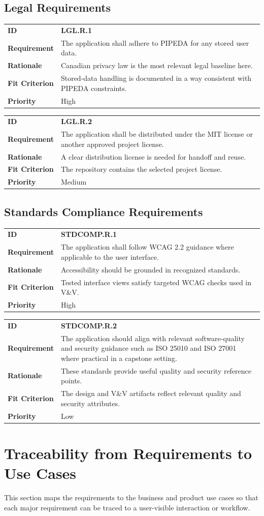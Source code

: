 \documentclass[12pt]{article}
\makeatletter
\newcommand{\reqcard}[5]{%
\noindent\begin{tabularx}{\textwidth}{@{}p{2.35cm}X@{}}
\textbf{ID} & \textbf{#1} \\
\textbf{Requirement} & #2 \\
\textbf{Rationale} & #3 \\
\textbf{Fit Criterion} & #4 \\
\textbf{Priority} & #5 \\
\end{tabularx}\par\medskip
}
\makeatother
\begin{document}
\subsection{Legal Requirements}
\reqcard{LGL.R.1}{The application shall adhere to PIPEDA for any
stored user data.}{Canadian privacy law is the most relevant legal
baseline here.}{Stored-data handling is documented in a way consistent
with PIPEDA constraints.}{High}

\reqcard{LGL.R.2}{The application shall be distributed under the MIT
license or another approved project license.}{A clear distribution
license is needed for handoff and reuse.}{The repository contains the
selected project license.}{Medium}

\subsection{Standards Compliance Requirements}
\reqcard{STDCOMP.R.1}{The application shall follow WCAG 2.2 guidance
where applicable to the user interface.}{Accessibility should be
grounded in recognized standards.}{Tested interface views satisfy
targeted WCAG checks used in V\&V.}{High}

\reqcard{STDCOMP.R.2}{The application should align with relevant
software-quality and security guidance such as ISO 25010 and ISO 27001
where practical in a capstone setting.}{These standards provide useful
quality and security reference points.}{The design and V\&V artifacts
reflect relevant quality and security attributes.}{Low}

\section{Traceability from Requirements to Use Cases}
This section maps the requirements to the business and product use
cases so that each major requirement can be traced to a user-visible
interaction or workflow.
\end{document}
